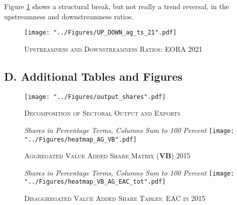 \documentclass[a4paper]{article}
\begin{document}
Figure \ref{fig:UP_DOWN_ag_ts_21} shows a structural break, but not really a trend reversal, in the upstreamness and downstreamness ratios. 

\begin{figure}[h!] %
\centering
\caption{\label{fig:UP_DOWN_ag_ts_21}\textsc{Upstreamness and Downstreamness Ratios: EORA 2021}}
\texttt{[image: "../Figures/UP\_DOWN\_ag\_ts\_21".pdf]} %
\end{figure} 
\FloatBarrier 


\subsection*{D. Additional Tables and Figures}
\setcounter{table}{0}
\renewcommand{\thetable}{D\arabic{table}}
\setcounter{figure}{0}
\renewcommand{\thefigure}{D\arabic{figure}}

\begin{figure}[!h]
\centering
\vspace{-2cm}
\caption{\label{fig:outshares}\textsc{Decomposition of Sectoral Output and Exports}}
\vspace*{\fill}
\begin{adjustbox}{center}
\texttt{[image: "../Figures/output\_shares".pdf]} %
\end{adjustbox}
\vspace*{\fill}
\end{figure}
\FloatBarrier

\begin{figure}[h!]
\centering
\caption{\label{fig:wldVB}\textsc{Aggregated Value Added Share Matrix (\textbf{VB}) 2015}}
\small{\textit{Shares in Percentage Terms, Columns Sum to 100 Percent}}
\texttt{[image: "../Figures/heatmap\_AG\_VB".pdf]} %
\end{figure}
\FloatBarrier

\begin{figure}[h!]
\centering
\caption{\label{fig:eacVB}\textsc{Disaggregated Value Added Share Tables: EAC in 2015}}
\small{\textit{Shares in Percentage Terms, Columns Sum to 100 Percent}}
\texttt{[image: "../Figures/heatmap\_VB\_AG\_EAC\_tot".pdf]} %
\end{figure}
\FloatBarrier
\end{document}
